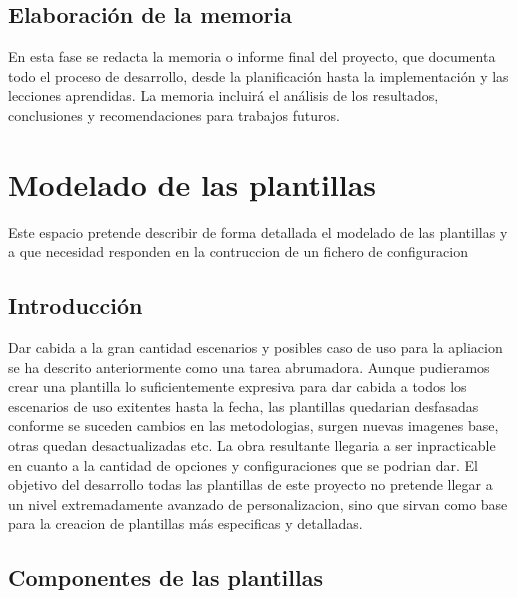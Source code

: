 \documentclass[12pt, a4paper, twoside]{article}
\begin{document}
\subsection{Elaboración de la memoria}
En esta fase se redacta la memoria o informe final del proyecto, que documenta todo el proceso de desarrollo, desde la 
planificación hasta la implementación y las lecciones aprendidas. La memoria incluirá el análisis de los resultados, 
conclusiones y recomendaciones para trabajos futuros. 



















\section{Modelado de las plantillas}
\label{sec:Modelado de las plantillas}
Este espacio pretende describir de forma detallada el modelado de las plantillas y a que necesidad responden en la contruccion de un fichero de configuracion
\subsection{Introducción}
Dar cabida a la gran cantidad escenarios y posibles caso de uso para la apliacion se ha descrito anteriormente como una tarea abrumadora.
Aunque pudieramos crear una plantilla lo suficientemente expresiva para dar cabida a todos los escenarios de uso exitentes hasta la fecha, las plantillas quedarian desfasadas conforme se suceden cambios 
en las metodologias, surgen nuevas imagenes base, otras quedan desactualizadas etc. La obra resultante llegaria a ser inpracticable en cuanto a la cantidad de opciones y configuraciones que se podrian dar.
El objetivo del desarrollo todas las plantillas de este proyecto no pretende llegar a un nivel extremadamente avanzado de personalizacion, sino que sirvan como base para la creacion de plantillas más especificas y detalladas.

\newpage

\subsection{Componentes de las plantillas}
\end{document}
